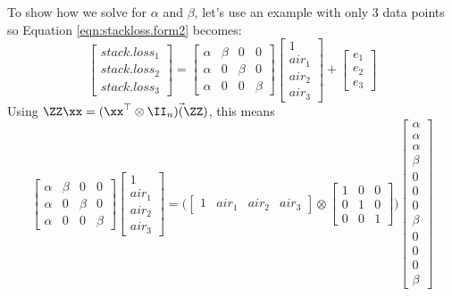 To show how we solve for $\alpha$ and $\beta$, let's use an example with only 3 data points so Equation \ref{eqn:stackloss.form2} becomes:
\begin{equation}\label{eqn:stackloss.form2.small}
\begin{bmatrix}stack.loss_1\\stack.loss_2\\stack.loss_3\end{bmatrix}
= 
\begin{bmatrix}
\alpha&\beta&0&0\\
\alpha&0&\beta&0\\
\alpha&0&0&\beta
\end{bmatrix}
\begin{bmatrix}1\\air_1\\air_2\\air_3\end{bmatrix}
+
\begin{bmatrix}e_1\\e_2\\e_3\end{bmatrix}
\end{equation}
Using $\ZZ\xx = (\xx^\top \otimes \II_n)\vec(\ZZ)$, this means
\begin{equation}
\begin{bmatrix}
\alpha&\beta&0&0\\
\alpha&0&\beta&0\\
\alpha&0&0&\beta
\end{bmatrix}
\begin{bmatrix}1\\air_1\\air_2\\air_3\end{bmatrix}
=\big(\begin{bmatrix}1&air_1&air_2& air_3\end{bmatrix} \otimes \begin{bmatrix}1&0&0\\ 0&1&0 \\ 0&0&1 \end{bmatrix} \bigr)
\begin{bmatrix}
\alpha\\
\alpha\\
\alpha\\
\beta\\
0\\
0\\
0\\
\beta\\
0\\
0\\
0\\
\beta
\end{bmatrix}
\end{equation}
